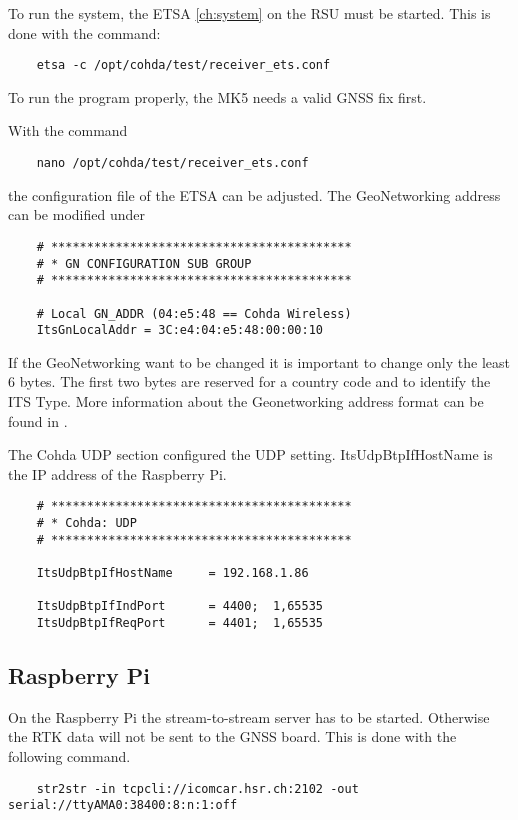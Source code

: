 To run the system, the ETSA \ref{ch:system} on the RSU must be started. This is done with the command: 
\begin{lstlisting}
	etsa -c /opt/cohda/test/receiver_ets.conf
\end{lstlisting} 

To run the program properly, the MK5 needs a valid GNSS fix first. 

With the command
\begin{lstlisting}
	nano /opt/cohda/test/receiver_ets.conf
\end{lstlisting}
the configuration file of the ETSA can be adjusted. The GeoNetworking address can be modified under
\begin{lstlisting}	
	# ******************************************
	# * GN CONFIGURATION SUB GROUP
	# ******************************************
	
	# Local GN_ADDR (04:e5:48 == Cohda Wireless)
	ItsGnLocalAddr = 3C:e4:04:e5:48:00:00:10	
\end{lstlisting}
If the GeoNetworking want to be changed it is important to change only the least 6 bytes. The first two bytes are reserved for a country code and to identify the ITS Type. More information about the Geonetworking address format can be found in \cite{ETSI_EN_302_636-4-1}.

The Cohda UDP section configured the UDP setting. ItsUdpBtpIfHostName is the IP address of the Raspberry Pi. 
\begin{lstlisting}
	# ******************************************
	# * Cohda: UDP
	# ******************************************
	
	ItsUdpBtpIfHostName     = 192.168.1.86            
	
	ItsUdpBtpIfIndPort      = 4400;  1,65535          
	ItsUdpBtpIfReqPort      = 4401;  1,65535         	
\end{lstlisting}

\subsection{Raspberry Pi}

On the Raspberry Pi the stream-to-stream server has to be started. Otherwise the RTK data will not be sent to the GNSS board. This is done with the following command.

\begin{lstlisting}
	str2str -in tcpcli://icomcar.hsr.ch:2102 -out serial://ttyAMA0:38400:8:n:1:off
\end{lstlisting}

